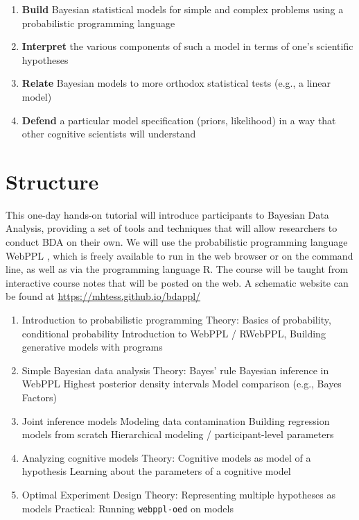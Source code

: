 \documentclass[10pt,letterpaper]{article}
\providecommand{\tightlist}{%
  \setlength{\itemsep}{0pt}\setlength{\parskip}{0pt}}
\begin{document}
\begin{enumerate}
\tightlist
\item \textbf{Build} Bayesian statistical models for simple and complex problems using a probabilistic programming language 
\item \textbf{Interpret} the various components of such a model in terms of one's scientific hypotheses 
\item \textbf{Relate} Bayesian models to more orthodox statistical tests (e.g., a linear model) 
\item \textbf{Defend} a particular model specification (priors, likelihood) in a way that other cognitive scientists will understand
\end{enumerate}

\section{Structure}

This one-day hands-on tutorial will introduce participants to Bayesian Data Analysis, providing a set of tools and techniques that will allow researchers to conduct BDA on their own. 
We will use the probabilistic programming language WebPPL \cite{dippl}, which is freely available to run in the web browser or on the command line, as well as via the programming language R.  
The course will be taught from interactive course notes that will be posted on the web. 
A schematic website can be found at \url{https://mhtess.github.io/bdappl/}

\begin{enumerate}
\tightlist
\item Introduction to probabilistic programming
	\subitem Theory: Basics of probability, conditional probability
	\subitem Introduction to WebPPL / RWebPPL, 
	\subitem Building generative models with programs
\item Simple Bayesian data analysis
	\subitem Theory: Bayes' rule
	\subitem Bayesian inference in WebPPL
	\subitem Highest posterior density intervals
	\subitem Model comparison (e.g., Bayes Factors)
\item Joint inference models
	\subitem Modeling data contamination
	\subitem Building regression models from scratch 
	\subitem Hierarchical modeling  / participant-level parameters
\item Analyzing cognitive models
	\subitem Theory: Cognitive models as model of a hypothesis
	\subitem Learning about the parameters of a cognitive model
\item Optimal Experiment Design
	\subitem Theory: Representing multiple hypotheses as models 
	\subitem Practical: Running \texttt{webppl-oed} on models
\end{enumerate}
\end{document}
